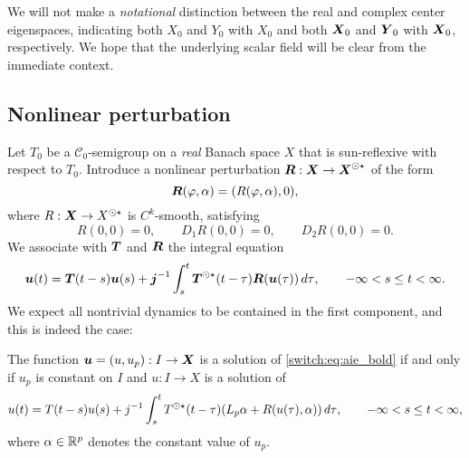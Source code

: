 \begin{remark}\label{switch:rem:X0Y0}
We will not make a \emph{notational} distinction between the real and complex center eigenspaces, indicating both $X_0$ and $Y_0$ with $X_0$ and both $\boldsymbol{X}_0$ and $\boldsymbol{Y}_0$ with $\boldsymbol{X}_0$, respectively. We hope that the underlying scalar field will be clear from the immediate context.
\end{remark}

\subsection{Nonlinear perturbation}\label{switch:sec:nonlinear_bold}
Let $T_0$ be a $\mathcal{C}_0$-semigroup on a \emph{real} Banach space $X$ that is sun-reflexive with respect to $T_0$. Introduce a nonlinear perturbation $\boldsymbol{R} : \boldsymbol{X} \to \boldsymbol{X}^{\odot\star}$ of the form
\begin{equation}\label{switch:eq:R_bold}
  \boldsymbol{R}(\varphi,\alpha) = (R(\varphi,\alpha), 0),
\end{equation}
where $R : \boldsymbol{X} \to X^{\odot\star}$ is $C^k$-smooth, satisfying
%
\begin{equation}\label{switch:eq:R_conditions}
  R(0,0) = 0, \qquad D_1{R}(0,0) = 0, \qquad D_2{R}(0,0) = 0.
\end{equation}
%
We associate with $\boldsymbol{T}$ and $\boldsymbol{R}$ the integral equation
%
\begin{equation}
  \label{switch:eq:aie_bold}
  \boldsymbol{u}(t) = \boldsymbol{T}(t - s)\boldsymbol{u}(s) + \boldsymbol{j}^{-1}\int_s^t{\boldsymbol{T}^{\odot\star}(t - \tau)\boldsymbol{R}(\boldsymbol{u}(\tau))\,d\tau}, \qquad -\infty < s \le t < \infty.
\end{equation}
%
We expect all nontrivial dynamics to be contained in the first component, and this is indeed the case:
%
\begin{proposition}\label{switch:prop:aie_bold}
  The function $\boldsymbol{u} = (u, u_p) : I \to \boldsymbol{X}$ is a solution of \cref{switch:eq:aie_bold} if and only if $u_p$ is constant on $I$ and $u : I \to X$ is a solution of
  \begin{equation}\label{switch:eq:aie_bold_1st}
    u(t) = T(t - s)u(s) + j^{-1}\int_s^t{T^{\odot\star}(t - \tau)(L_p\alpha + R(u(\tau),\alpha))\,d\tau}, \qquad -\infty < s \le t < \infty,
  \end{equation}
  where $\alpha \in \mathbb{R}^p$ denotes the constant value of $u_p$.
\end{proposition}
